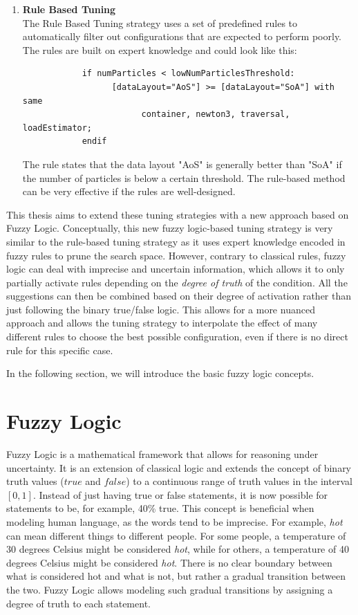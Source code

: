 \begin{enumerate}
      \item \textbf{Rule Based Tuning} \\
            The Rule Based Tuning strategy uses a set of predefined rules to automatically filter out configurations that are expected to perform poorly. The rules are built on expert knowledge and could look like this:
            \begin{small}
                  \begin{verbatim}
            if numParticles < lowNumParticlesThreshold:
                  [dataLayout="AoS"] >= [dataLayout="SoA"] with same 
                        container, newton3, traversal, loadEstimator;
            endif
            \end{verbatim}
            \end{small}
            The rule states that the data layout "AoS" is generally better than "SoA" if the number of particles is below a certain threshold. The rule-based method can be very effective if the rules are well-designed.
\end{enumerate}


This thesis aims to extend these tuning strategies with a new approach based on Fuzzy Logic. Conceptually, this new fuzzy logic-based tuning strategy is very similar to the rule-based tuning strategy as it uses expert knowledge encoded in fuzzy rules to prune the search space. However, contrary to classical rules, fuzzy logic can deal with imprecise and uncertain information, which allows it to only partially activate rules depending on the \emph{degree of truth} of the condition.
All the suggestions can then be combined based on their degree of activation rather than just following the binary true/false logic. This allows for a more nuanced approach and allows the tuning strategy to interpolate the effect of many different rules to choose the best possible configuration, even if there is no direct rule for this specific case.

In the following section, we will introduce the basic fuzzy logic concepts.


\section{Fuzzy Logic}

Fuzzy Logic is a mathematical framework that allows for reasoning under uncertainty. It is an extension of classical logic and extends the concept of binary truth values ($true$ and $false$) to a continuous range of truth values in the interval $[0, 1]$. Instead of just having true or false statements, it is now possible for statements to be, for example, 40\% true. This concept is beneficial when modeling human language, as the words tend to be imprecise. For example, \emph{hot} can mean different things to different people. For some people, a temperature of 30 degrees Celsius might be considered \emph{hot}, while for others, a temperature of 40 degrees Celsius might be considered \emph{hot}. There is no clear boundary between what is considered hot and what is not, but rather a gradual transition between the two. Fuzzy Logic allows modeling such gradual transitions by assigning a degree of truth to each statement.

